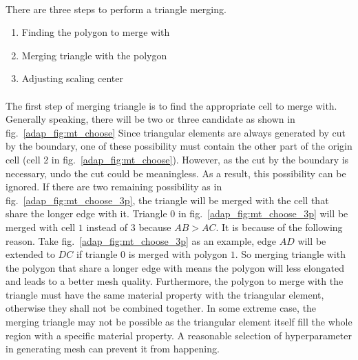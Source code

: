 \paragraph{}
There are three steps to perform a triangle merging.
\begin{enumerate}
    \item Finding the polygon to merge with
    \item Merging triangle with the polygon
    \item Adjusting scaling center
\end{enumerate}

\paragraph{}
The first step of merging triangle is to find the appropriate cell to merge with.
Generally speaking, there will be two or three candidate as shown in fig.~\ref{adap_fig:mt_choose}
Since triangular elements are always generated by cut by the boundary, one of these possibility must contain the other part of the origin cell (cell 2 in fig.~\ref{adap_fig:mt_choose}).
However, as the cut by the boundary is necessary, undo the cut could be meaningless.
As a result, this possibility can be ignored.
If there are two remaining possibility as in fig.~\ref{adap_fig:mt_choose_3p}, the triangle will be merged with the cell that share the longer edge with it.
Triangle $0$ in fig.~\ref{adap_fig:mt_choose_3p} will be merged with cell $1$ instead of $3$ because $AB > AC$.
It is because of the following reason.
Take fig.~\ref{adap_fig:mt_choose_3p} as an example, edge $AD$ will be extended to $DC$ if triangle $0$ is merged with polygon $1$.
So merging triangle with the polygon that share a longer edge with means the polygon will less elongated and leads to a better mesh quality.
Furthermore, the polygon to merge with the triangle must have the same material property with the triangular element, otherwise they shall not be combined together.
In some extreme case, the merging triangle may not be possible as the triangular element itself fill the whole region with a specific material property.
A reasonable selection of hyperparameter in generating mesh can prevent it from happening.


